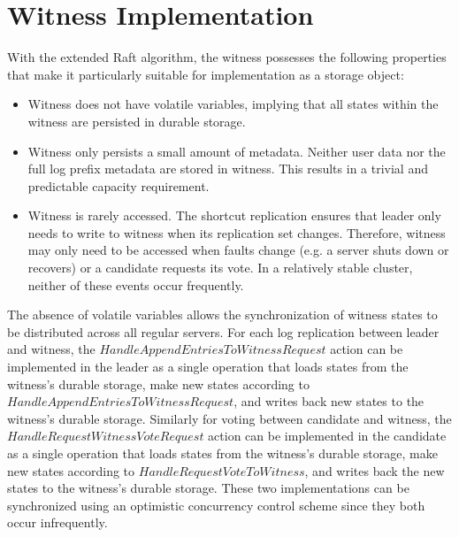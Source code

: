 \section{Witness Implementation} \label{section:witness-implementation}
With the extended Raft algorithm, the witness possesses the following properties that make it particularly suitable for implementation as a storage object:

\begin{itemize} 
    \item Witness does not have volatile variables, implying that all states within the witness are persisted in durable storage. 
    \item Witness only persists a small amount of metadata. Neither user data nor the full log prefix metadata are stored in witness. This results in a trivial and predictable capacity requirement. 
    \item Witness is rarely accessed. The shortcut replication ensures that leader only needs to write to witness when its replication set changes. Therefore, witness may only need to be accessed when faults change (e.g. a server shuts down or recovers) or a candidate requests its vote. In a relatively stable cluster, neither of these events occur frequently. 
\end{itemize}

The absence of volatile variables allows the synchronization of witness states to be distributed across all regular servers. For each log replication between leader and witness, the $HandleAppendEntriesToWitnessRequest$ action can be implemented in the leader as a single operation that loads states from the witness's durable storage, make new states according to $HandleAppendEntriesToWitnessRequest$, and writes back new states to the witness's durable storage. Similarly for voting between candidate and witness, the $HandleRequestWitnessVoteRequest$ action can be implemented in the candidate as a single operation that loads states from the witness's durable storage, make new states according to $HandleRequestVoteToWitness$, and writes back the new states to the witness's durable storage. These two implementations can be synchronized using an optimistic concurrency control scheme since they both occur infrequently.

